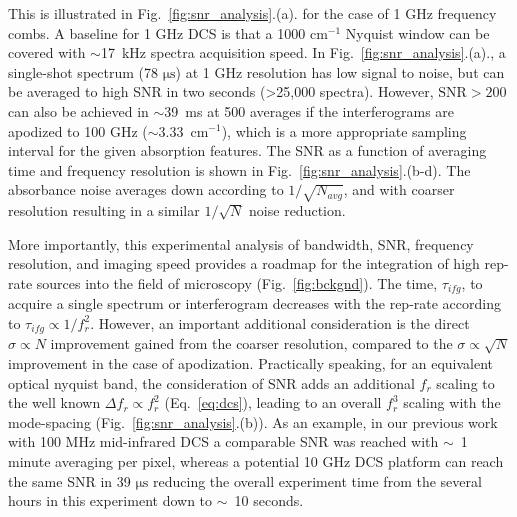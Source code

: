 \documentclass{optica-article}
\begin{document}
This is illustrated in \mbox{Fig. \ref{fig:snr_analysis}.(a).} for the case of 1 GHz frequency combs. A baseline for 1 GHz DCS is that a 1000 $\mathrm{cm^{-1}}$ Nyquist window can be covered with \mbox{$\sim$17 kHz} spectra acquisition speed. In \mbox{Fig. \ref{fig:snr_analysis}.(a).}, a single-shot spectrum (78 $\mathrm{\mu s}$) at 1 GHz resolution has low signal to noise, but can be averaged to high SNR in two seconds (>25,000 spectra). However, \mbox{$\mathrm{SNR>200}$} can also be achieved in \mbox{$\sim$39 ms} at 500 averages if the interferograms are apodized to 100 GHz (\mbox{$\sim$3.33 $\mathrm{cm^{-1}}$}), which is a more appropriate sampling interval for the given absorption features. The SNR as a function of averaging time and frequency resolution is shown in \mbox{Fig. \ref{fig:snr_analysis}.(b-d)}. The absorbance noise averages down according to $1/\sqrt{N_{avg}}$, and with coarser resolution resulting in a similar $1/\sqrt{N}$ noise reduction. 

More importantly, this experimental analysis of bandwidth, SNR, frequency resolution, and imaging speed provides a roadmap for the integration of high rep-rate sources into the field of microscopy (\mbox{Fig. \ref{fig:bckgnd}}). The time, $\tau_{ifg}$, to acquire a single spectrum or interferogram decreases with the rep-rate according to $\tau_{ifg} \propto 1 / f_r^2$. However, an important additional consideration is the direct $\sigma \propto N$ improvement gained from the coarser resolution, compared to the $\sigma \propto \sqrt{N}$ improvement in the case of apodization. Practically speaking, for an equivalent optical nyquist band, the consideration of SNR adds an additional $f_r$ scaling to the well known $\Delta f_r \propto f_r^2$ (\mbox{Eq. \ref{eq:dcs}}), leading to an overall $f_r^3$ scaling with the mode-spacing (\mbox{Fig. \ref{fig:snr_analysis}.(b)}). As an example, in our previous work with 100 MHz mid-infrared DCS \cite{lindMidInfraredFrequencyComb2020,timmersMolecularFingerprintingBright2018} a comparable SNR was reached with \mbox{$\sim$ 1} minute averaging per pixel, whereas a potential 10 GHz DCS platform can reach the same SNR in 39 $\mathrm{\mu s}$ reducing the overall experiment time from the several hours in this experiment down to \mbox{$\sim$ 10} seconds.
\end{document}
